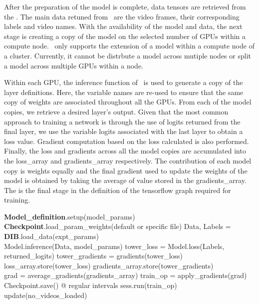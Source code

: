 \documentclass{llncs}
\begin{document}
After the preparation of the model is complete, data tensors are retrieved from the \data.
The main data retuned from \data~are the video frames, their corresponding labels and video names.
With the availability of the model and data, the next stage is creating a copy of the model on the selected number of GPUs within a compute node.
\acro~only supports the extension of a model within a compute node of a cluster. 
Currently, it cannot be distrbute a model across mutiple nodes or split a model across multiple GPUs within a node.

Within each GPU, the inference function of \model~is used to generate a copy of the layer definitions. 
Here, the variable names are re-used to ensure that the same copy of weights are associated throughout all the GPUs.
From each of the model copies, we retrieve a desired layer's output. 
Given that the most common approach to training a network is through the use of logits returned from the final layer, we use the variable logits associated with the last layer to obtain a loss value.
Gradient computation based on the loss calculated is also performed.
Finally, the loss and gradients across all the model copies are accumulated into the loss\_array and gradients\_array respectively.
The contribution of each model copy is weights equally and the final gradient used to update the weights of the model is obtained by taking the average of value stored in the gradients\_array.
The is the final stage in the definition of the tensorflow graph required for training.

\begin{algorithmic}[H]
\State \textbf{Model\_definition}.setup(model\_params)
\State \textbf{Checkpoint}.load\_param\_weights(default or specific file)
\State Data, Labels = \textbf{DIB}.load\_data(expt\_params)
\\
\State Model.inference(Data, model\_params)
\State tower\_loss = Model.loss(Labels, returned\_logits)
\State tower\_gradients = gradients(tower\_loss)
\State loss\_array.store(tower\_loss)
\State gradients\_array.store(tower\_gradients)
\EndFor
\\
\State grad = average\_gradients(gradients\_array)
\State train\_op = apply\_gradients(grad)
\\
\State Checkpoint.save() @ regular intervals
\State sess.run(train\_op)
\State update(no\_videos\_loaded)
\EndWhile
\EndProcedure
\end{algorithmic}
\end{document}
